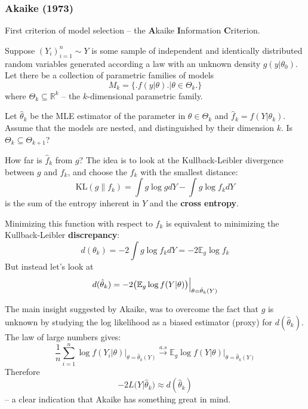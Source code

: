 \documentclass[a4paper]{article}
\newcommand{\Real}{\mathbb{R}}
\newcommand{\ex}{\mathbb{E}}
\begin{document}

\subsubsection{Akaike (1973)} %
\label{ssub:akaike_1973}

\noindent First criterion of model selection -- the \textbf{A}kaike \textbf{I}nformation
\textbf{C}riterion.

Suppose $(Y_i)_{i=1}^n\sim Y$ is some sample of independent and identically
distributed random variables generated according a law with an unknown density
$g(y|\theta_0)$. Let there be a collection of parametric families of models
\[ M_k = \bigl\{\bigr. f(y|\theta) \bigl.\bigr\rvert \theta\in \Theta_k \bigl.\bigr\} \]
where $\Theta_k\subseteq \Real^k$ -- the $k$-dimensional parametric family.



Let $\hat{\theta}_k$ be the MLE estimator of the parameter in $\theta\in \Theta_k$
and $\hat{f}_k = f(Y|\theta_k)$. Assume that the models are nested, and distinguished
by their dimension $k$.
Is $\Theta_k\subseteq \Theta_{k+1}$?

How far is $\hat{f}_k$ from $g$? The idea is to look at the Kullback-Leibler divergence
between $g$ and $f_k$, and choose the $f_k$ with the smallest distance:
\[\text{KL}(g\|f_k) = \int g \log g dY - \int g \log f_k dY\]
is the sum of the entropy inherent in $Y$ and the \textbf{cross entropy}.

Minimizing this function with respect to $f_k$ is equivalent to minimizing the
Kullback-Leibler \textbf{discrepancy}:
\[
d( \theta_k )
= - 2 \int g \log f_k dY
= - 2 \ex_g \log f_k
\]
But instead let's look at
\[
d( \hat{\theta}_k )
= - 2 \Bigl.\bigl(\ex_g \log f(Y|\theta) \bigr)\Bigr\rvert_{\theta = \hat{\theta}_k(Y)}
\]

The main insight suggested by Akaike, was to overcome the fact that $g$ is unknown
by studying the log likelihood as a biased estimator (proxy) for $d(\hat{\theta}_k)$.
The law of large numbers gives:
\[
\frac{1}{n} \sum_{i=1}^n \log f(Y_i|\theta)\Big\rvert_{\theta = \hat{\theta}_k(Y)}
\overset{a.s}{\to}
\ex_g \log f(Y|\theta)\Big\rvert_{\theta = \hat{\theta}_k(Y)}
\]
Therefore
\[ - 2 L\bigl(Y|\hat{\theta}_k\bigr) \approx d(\hat{\theta}_k) \]
-- a clear indication that Akaike has something great in mind.
\end{document}
